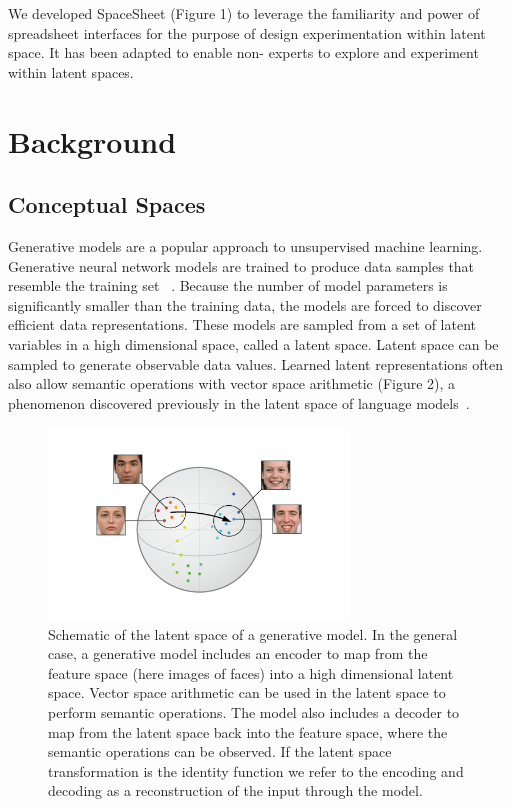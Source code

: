 \documentclass[letterpaper]{article}
\begin{document}
We developed SpaceSheet (Figure 1) to leverage the familiarity and power of spreadsheet interfaces for the purpose of design experimentation within latent space. It has been adapted to enable non- experts to explore and experiment within latent spaces.

\section{Background}

\subsection{Conceptual Spaces}

Generative models are a popular approach to unsupervised machine learning. Generative neural network models are trained to produce data samples that resemble the training set ~\cite{openai1}. Because the number of model parameters is significantly smaller than the training data, the models are forced to discover efficient data representations. These models are sampled from a set of latent variables in a high dimensional space, called a latent space. Latent space can be sampled to generate observable data values. Learned latent representations often also allow semantic operations with vector space arithmetic (Figure 2), a phenomenon discovered previously in the latent space of language models~\cite{wordvec}.

\begin{figure}[ht]
  \centering
  \includegraphics[width=8cm]{figs/face_space.png}
  \caption{Schematic of the latent space of a generative model. In the general case, a generative model includes an encoder to map from the feature space (here images of faces) into a high dimensional latent space. Vector space arithmetic can be used in the latent space to perform semantic operations. The model also includes a decoder to map from the latent space back into the feature space, where the semantic operations can be observed. If the latent space transformation is the identity function we refer to the encoding and decoding as a reconstruction of the input through the model. }
\end{figure}
\end{document}
